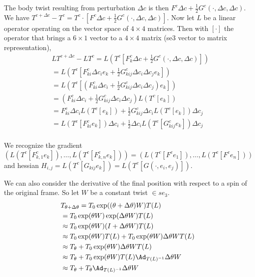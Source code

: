 \documentclass[12pt]{article}
\begin{document}
The body twist resulting from perturbation $\Delta c$ is then $F^c \Delta c + \frac{1}{2}  G^c(\cdot, \Delta c, \Delta c)$.
We have $T^{c + \Delta c} - T^c = T^c \cdot \left[F^c \Delta c + \frac{1}{2}  G^c(\cdot, \Delta c, \Delta c)\right]$.
Now let $L$ be a linear operator operating on the vector space of $4 \times 4$ matrices. Then with $[\cdot]$ the operator
that brings a $6 \times 1$ vector to a $4 \times 4$ matrix (se3 vector to matrix representation),
\[
\begin{aligned}
  &L T^{c + \Delta c} - L T^c = L\left(T^c  \left[F^c_k \Delta c + \frac{1}{2}  G^c(\cdot, \Delta c, \Delta c)\right]\right)\\
  &= L\left(T^c  \left[F^c_{ki} \Delta c_i e_k + \frac{1}{2}  G^c_{kij}\Delta c_i \Delta c_j e_k\right]\right)\\
  &= L\left(T^c  \left[(F^c_{ki} \Delta c_i  + \frac{1}{2}  G^c_{kij}\Delta c_i \Delta c_j) e_k\right]\right)\\
  &= (F^c_{ki} \Delta c_i  + \frac{1}{2}  G^c_{kij}\Delta c_i \Delta c_j) L\left(T^c [e_k]\right)\\
  &= F^c_{ki} \Delta c_i L\left(T^c [e_k]\right)  + \frac{1}{2}  G^c_{kij}\Delta c_iL\left(T^c [e_k]\right) \Delta c_j \\
  &=  L\left(T^c [F^c_{ki} e_k]\right)\Delta c_i  + \frac{1}{2}  \Delta c_iL\left(T^c [G^c_{kij} e_k]\right) \Delta c_j \\
  \end{aligned}
\]

We recognize the gradient $\left( L(T^c[F^c_{k,1} e_k]), \ldots, L(T^c[F^c_{k,n} e_k]) \right) = \left( L(T^c[F^c e_1]), \ldots, L(T^c[F^c e_n]) \right)$ and hessian $H_{i,j} = L\left(T^c[G_{kij}e_k]\right) = L\left(T^c[G(\cdot, e_i, e_j)]\right)$. 

We can also consider the derivative of the final position with respect to a spin of the original frame. So let $W$ be a constant twist $\in se_3$.
\[
\begin{aligned}
  &T_{\theta + \Delta \theta} = T_0 \exp((\theta + \Delta \theta) W) T(L) \\
  & = T_0 \exp(\theta W) \exp(\Delta \theta W) T(L) \\
  & \approx T_0 \exp(\theta W)(I + \Delta \theta W) T(L) \\
  & \approx T_0 \exp(\theta W) T(L) + T_0 \exp(\theta W) \Delta \theta W T(L) \\
  & \approx T_\theta + T_0 \exp(\theta W) \Delta \theta W T(L) \\
  & \approx T_\theta + T_0 \exp(\theta W) T(L) \Ad_{T(L)^{-1}} \Delta \theta W \\
  & \approx T_\theta + T_\theta \Ad_{T(L)^{-1}} \Delta \theta W \\
\end{aligned}
\]
\end{document}
